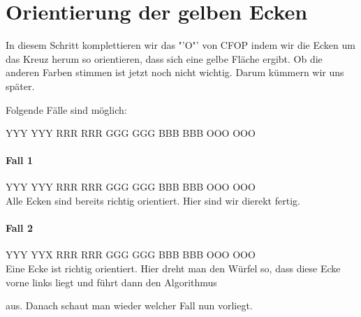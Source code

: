 \section{Orientierung der gelben Ecken}
\parbox{0.7\linewidth}{
In diesem Schritt komplettieren wir das "'O"' von CFOP indem wir die Ecken um das Kreuz herum so orientieren, dass sich eine gelbe Fläche ergibt. 
Ob die anderen Farben stimmen ist jetzt noch nicht wichtig. 
Darum kümmern wir uns später.

Folgende Fälle sind möglich:
}
\RubikCubeGreyAll%
            {Y}{Y}{Y}
            {Y}{Y}{Y}%
               {R}{R}{R}
	       {R}{R}{R}%
	       {G}{G}{G}
	       {G}{G}{G}%
	      {B}{B}{B}
	      {B}{B}{B}%
	      {O}{O}{O}
	      {O}{O}{O}%
\\[1em]

\paragraph{Fall 1}
\RubikCubeGreyAll%
            {Y}{Y}{Y}
            {Y}{Y}{Y}%
               {R}{R}{R}
	       {R}{R}{R}%
	       {G}{G}{G}
	       {G}{G}{G}%
	      {B}{B}{B}
	      {B}{B}{B}%
	      {O}{O}{O}
	      {O}{O}{O}%
\\[1em]
Alle Ecken sind bereits richtig orientiert. Hier sind wir dierekt fertig.

\paragraph{Fall 2}
\RubikCubeGreyAll%
            {Y}{Y}{Y}
            {Y}{Y}{X}%
               {R}{R}{R}
	       {R}{R}{R}%
	       {G}{G}{G}
	       {G}{G}{G}%
	      {B}{B}{B}
	      {B}{B}{B}%
	      {O}{O}{O}
	      {O}{O}{O}%
\\[1em]
Eine Ecke ist richtig orientiert. Hier dreht man den Würfel so, dass diese
Ecke vorne links liegt und führt dann den Algorithmus
\begin{center}
\end{center}
aus. Danach schaut man wieder welcher Fall nun vorliegt.

